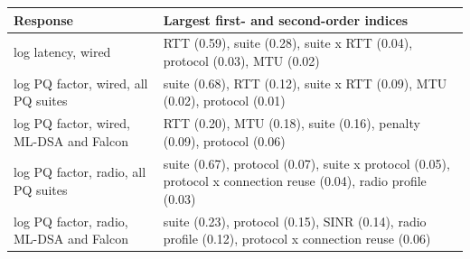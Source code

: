 \begin{tabular}{@{}lp{}@{}}
\toprule
Response & Largest first- and second-order indices \\
\midrule
log latency, wired & RTT (0.59), suite (0.28), suite x RTT (0.04), protocol (0.03), MTU (0.02) \\
log PQ factor, wired, all PQ suites & suite (0.68), RTT (0.12), suite x RTT (0.09), MTU (0.02), protocol (0.01) \\
log PQ factor, wired, ML-DSA and Falcon & RTT (0.20), MTU (0.18), suite (0.16), penalty (0.09), protocol (0.06) \\
log PQ factor, radio, all PQ suites & suite (0.67), protocol (0.07), suite x protocol (0.05), protocol x connection reuse (0.04), radio profile (0.03) \\
log PQ factor, radio, ML-DSA and Falcon & suite (0.23), protocol (0.15), SINR (0.14), radio profile (0.12), protocol x connection reuse (0.06) \\
\bottomrule
\end{tabular}
